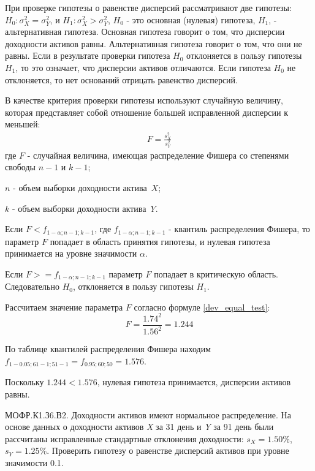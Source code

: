 \documentclass[12pt, table, a4paper,twoside]{exam}
\begin{document}
\begin{questions}
\begin{solution}[4em]

\raggedright
При проверке гипотезы о равенстве дисперсий рассматривают две гипотезы: $H_0: \sigma_X^2=\sigma_Y^2$, и $H_1: \sigma_X^2 > \sigma_Y^2$, $H_0$ - это основная (нулевая) гипотеза, $H_1$, - альтернативная гипотеза. 
Основная гипотеза говорит о том, что дисперсии доходности активов равны. Альтернативная гипотеза говорит о том, что они не равны. Если в результате проверки гипотеза $H_0$ отклоняется в пользу гипотезы $H_1$, то это означает, что дисперсии активов отличаются. Если гипотеза $H_0$ не отклоняется, то нет оснований отрицать равенство дисперсий.

В качестве критерия проверки гипотезы используют случайную величину, которая представляет собой отношение большей исправленной дисперсии к меньшей:
\begin{align}
\label{dev_equal_test}
F=\frac{s_X^2}{s_Y^2}
\end{align}
где
$F$ - случайная величина, имеющая распределение Фишера со степенями свободы $n-1$ и $k-1$;

$n$ - объем выборки доходности актива~$X$;

$k$ - объем выборки доходности актива~$Y$.

Если $F<f_{1-\alpha;n-1;k-1}$, где $f_{1-\alpha;n-1;k-1}$ - квантиль распределения Фишера, то параметр $F$ попадает в область принятия гипотезы, и нулевая гипотеза принимается на уровне значимости $\alpha$.

Если  $F>=f_{1-\alpha;n-1;k-1}$ параметр $F$ попадает в критическую область. Следовательно $H_0$, отклоняется в пользу гипотезы $H_1$.

Рассчитаем значение параметра $F$ согласно формуле \eqref{dev_equal_test}:
$$F=\frac{1.74^2}{1.56^2}=1.244$$

По таблице квантилей распределения Фишера находим $f_{1-0.05;61-1;51-1}=f_{0.95;60;50}=1.576$. 

Поскольку $1.244<1.576$, нулевая гипотеза принимается, дисперсии активов равны.
\end{solution}

\question[10] МОФР.К1.З6.В2. Доходности активов имеют нормальное распределение. На основе данных о доходности активов \textit{X} за 31 день и \textit{Y} за 91 день были рассчитаны исправленные стандартные отклонения доходности: $s_X=1.50\%$, $s_Y = 1.25\%$. Проверить гипотезу о равенстве дисперсий активов при уровне значимости 0.1.

\begin{solution}[4em]
	

\end{solution}
\end{questions}
\end{document}
